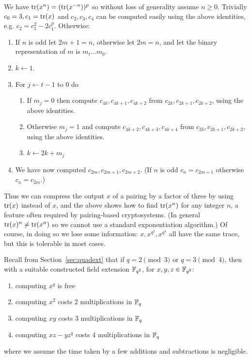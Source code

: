 We have $\mathop{\rm tr} (x^n) = (\mathop{\rm tr}(x^{-n}))^p$ so
without loss of generality assume $n \ge 0$.
Trivially $c_0 = 3, c_1 = \mathop{\rm tr}(x)$
and $c_2, c_3, c_4$ can be computed easily
using the above identities, e.g. $c_2 = c_1^2 - 2c_1^p$.
Otherwise:

\begin{enumerate}
\item
If $n$ is odd let $2m + 1 = n$, otherwise
let $2m = n$, and let the binary representation of
$m$ is $m_t ... m_0$.
\item
$k \leftarrow 1$.
\item
For $j \leftarrow t-1$ to $0$ do
\begin{enumerate}
\item
If $m_j = 0$ then
compute $c_{4k}, c_{4k+1}, c_{4k+2}$ from $c_{2k}, c_{2k+1}, c_{2k+2}$,
using the above identities.
\item
Otherwise $m_j = 1$ and
compute $c_{4k+2}, c_{4k+3}, c_{4k+4}$ from $c_{2k}, c_{2k+1}, c_{2k+2}$,
using the above identities.
\item
$k \leftarrow 2 k + m_j$
\end{enumerate}
\item
We have now computed $c_{2m}, c_{2m+1}, c_{2m+2}$. (If $n$ is odd
$c_n = c_{2m+1}$ otherwise $c_n = c_{2m}$.)
\end{enumerate}

Thus we can compress the output $x$ of a pairing by a factor of three by
using $\mathop{\rm tr}(x)$ instead of $x$, and the above shows how to find
$\mathop{\rm tr}(x^n)$ for any integer $n$,
a feature often required by pairing-based cryptosystems.
(In general $\mathop{\rm tr}(x)^n \ne \mathop{\rm tr}(x^n)$ so we cannot use a standard
exponentiation algorithm.)
Of course, in doing so we lose some information: $x, x^{q^2}, x^{q^4}$
all have the same trace, but this is tolerable in most cases.

Recall from Section~\ref{sec:quadext} that
if $q = 2 \pmod 3$ or $q = 3 \pmod 4$, then with a suitable constructed
field extension $\mathbb{F}_{q^2}$, for $x, y, z \in \mathbb{F}_{q^2}$:
\begin{enumerate}
\item
computing $x^q$ is free
\item
computing $x^2$ costs 2 multiplications in $\mathbb{F}_q$
\item
computing $x y$ costs 3 multiplications in $\mathbb{F}_q$
\item
computing $x z - y z^q$ costs 4 multiplications in $\mathbb{F}_q$
\end{enumerate}
where we assume the time taken by a few
additions and subtractions is negligible.

